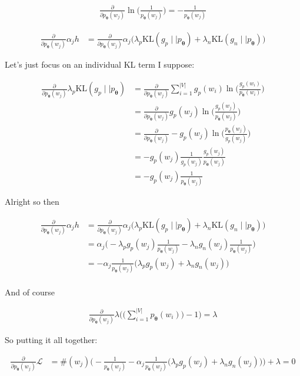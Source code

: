 \documentclass{article}
\newcommand{\KL}{\mathrm{KL}}
\newcommand{\vtheta}{\boldsymbol{\theta}}
\newcommand{\model}{p_{\vtheta}}
\begin{document}
		\begin{align}
			\frac{\partial}{\partial \model(w_j)} \ln\bigg(\frac{1}{\model(w_j)}\bigg) = -\frac{1}{\model(w_j)}
		\end{align}
		
		\begin{align}
			\frac{\partial}{\partial \model(w_j)} \alpha_j h &= \frac{\partial}{\partial \model(w_j)} \alpha_j\big(\lambda_p\KL(g_p\mid\mid\model) + \lambda_n\KL(g_n\mid\mid\model)\big)
		\end{align}
		
		Let's just focus on an individual KL term I suppose:
		
		\begin{align}
			\frac{\partial}{\partial \model(w_j)} \lambda_p\KL(g_p\mid\mid\model) &= \frac{\partial}{\partial \model(w_j)} \sum^{|V|}_{i=1} g_p(w_i)\ln\bigg(\frac{g_p(w_i)}{\model(w_i)}\bigg)\\
			&= \frac{\partial}{\partial \model(w_j)} g_p(w_j)\ln\bigg(\frac{g_p(w_j)}{\model(w_j)}\bigg)\\
			&= \frac{\partial}{\partial \model(w_j)} -g_p(w_j)\ln\bigg(\frac{\model(w_j)}{g_p(w_j)}\bigg)\\
			&=  -g_p(w_j)\frac{1}{g_p(w_j)}\frac{g_p(w_j)}{\model(w_j)}\\
			&=  -g_p(w_j)\frac{1}{\model(w_j)}
		\end{align}
		
		Alright so then 
		
		\begin{align}
			\frac{\partial}{\partial \model(w_j)} \alpha_j h &= \frac{\partial}{\partial \model(w_j)} \alpha_j\big(\lambda_p\KL(g_p\mid\mid\model) + \lambda_n\KL(g_n\mid\mid\model)\big)\\
			&= \alpha_j\bigg(-\lambda_p g_p(w_j)\frac{1}{\model(w_j)} -\lambda_n g_n(w_j)\frac{1}{\model(w_j)}\bigg)\\
			&= -\alpha_j\frac{1}{\model(w_j)}\bigg(\lambda_p g_p(w_j) +\lambda_n g_n(w_j)\bigg)\\
		\end{align}
		
		And of course
		
		\begin{align}
			\frac{\partial}{\partial \model(w_j)}  \lambda\bigg(\bigg(\sum^{|V|}_{i=1} \model(w_i)\bigg) -1 \bigg) = \lambda
		\end{align}
		
		So putting it all together:
		
		\begin{align}
			\frac{\partial}{\partial \model(w_j)} \mathcal{L} &= \#(w_j)\bigg(-\frac{1}{\model(w_j)} -\alpha_j\frac{1}{\model(w_j)}\bigg(\lambda_p g_p(w_j) +\lambda_n g_n(w_j)\bigg) \bigg) + \lambda = 0			
		\end{align}
		
\end{document}
